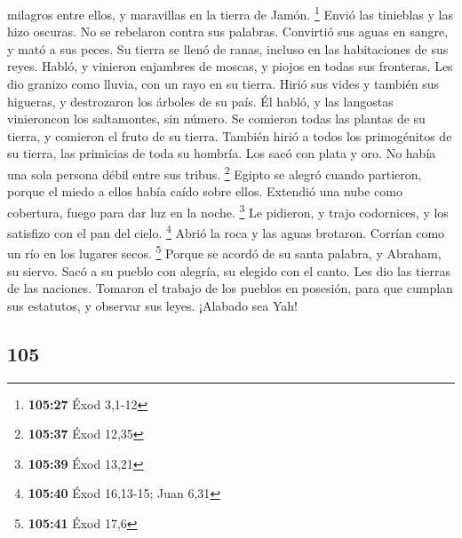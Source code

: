 \begin{paracol}{2}
milagros entre ellos, y maravillas en la tierra de Jamón. \footnote{\textbf{105:27}
  Éxod 3,1-12}  Envió las tinieblas y las hizo oscuras.
No se rebelaron contra sus palabras.  Convirtió sus aguas
en sangre, y mató a sus peces.  Su tierra se llenó de
ranas, incluso en las habitaciones de sus reyes.  Habló,
y vinieron enjambres de moscas, y piojos en todas sus fronteras.
 Les dio granizo como lluvia, con un rayo en su tierra.
 Hirió sus vides y también sus higueras, y destrozaron
los árboles de su país.  Él habló, y las langostas
vinieroncon los saltamontes, sin número.  Se comieron
todas las plantas de su tierra, y comieron el fruto de su tierra.
 También hirió a todos los primogénitos de su tierra, las
primicias de toda su hombría.  Los sacó con plata y oro.
No había una sola persona débil entre sus tribus. \footnote{\textbf{105:37}
  Éxod 12,35}  Egipto se alegró cuando partieron, porque
el miedo a ellos había caído sobre ellos.  Extendió una
nube como cobertura, fuego para dar luz en la noche. \footnote{\textbf{105:39}
  Éxod 13,21}  Le pidieron, y trajo codornices, y los
satisfizo con el pan del cielo. \footnote{\textbf{105:40} Éxod 16,13-15;
  Juan 6,31}  Abrió la roca y las aguas brotaron. Corrían
como un río en los lugares secos. \footnote{\textbf{105:41} Éxod 17,6}
 Porque se acordó de su santa palabra, y Abraham, su
siervo.  Sacó a su pueblo con alegría, su elegido con el
canto.  Les dio las tierras de las naciones. Tomaron el
trabajo de los pueblos en posesión,  para que cumplan sus
estatutos, y observar sus leyes. ¡Alabado sea Yah!

\switchcolumn
\begin{otherlanguage}{english}

\hypertarget{section-209}{%
\section{105}\label{section-209}}


\end{otherlanguage}
\end{paracol}
